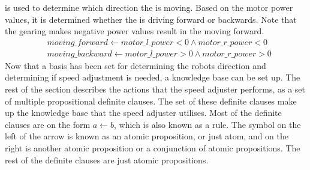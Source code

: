  is used to determine which direction the \projname{} is moving. Based on the motor power values, it is determined whether the \projname{} is driving forward or backwards. Note that the gearing makes negative power values result in the \projname{} moving forward. 
\begin{equation} \label{eq:moving-forward-and-backward}
\begin{split}
& moving\_forward \leftarrow motor\_l\_power < 0 \land motor\_r\_power < 0 \\
& moving\_backward \leftarrow motor\_l\_power > 0 \land motor\_r\_power > 0 
\end{split}
\end{equation}
Now that a basis has been set for determining the robots direction and determining if speed adjustment is needed, a knowledge base can be set up. The rest of the section describes the actions that the speed adjuster performs, as a set of multiple propositional definite clauses. The set of these definite clauses make up the knowledge base that the speed adjuster utilises. Most of the definite clauses are on the form $a \leftarrow b$, which is also known as a rule. The symbol on the left of the arrow is known as an atomic proposition, or just atom, and on the right is another atomic proposition or a conjunction of atomic propositions. The rest of the definite clauses are just atomic propositions.

